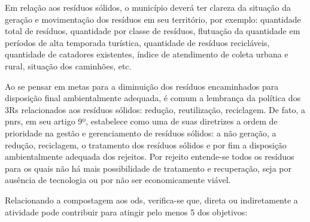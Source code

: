 Em relação aos resíduos sólidos, o município deverá ter clareza da situação da geração e movimentação dos resíduos em seu território, por exemplo: quantidade total de resíduos, quantidade por classe de resíduos, flutuação da quantidade em períodos de alta temporada turística, quantidade de resíduos recicláveis, quantidade de catadores existentes, índice de atendimento de coleta urbana e rural, situação dos caminhões, etc.

Ao se pensar em metas para a diminuição dos resíduos encaminhados para disposição final ambientalmente adequada, é comum a lembrança da política dos 3Rs relacionados aos resíduos sólidos: redução, reutilização, reciclagem. De fato, a \gls{pnrs}, em seu artigo 9º, estabelece como uma de suas diretrizes a ordem de prioridade na gestão e gerenciamento de resíduos sólidos: a não geração, a redução, reciclagem, o tratamento dos resíduos sólidos e por fim a disposição ambientalmente adequada dos rejeitos. \cite{brasil:12305} Por rejeito entende-se todos os resíduos para os quais não há mais possibilidade de tratamento e recuperação, seja por ausência de tecnologia ou por não ser economicamente viável.

Relacionando a compostagem aos \gls{ods}, verifica-se que, direta ou indiretamente a atividade pode contribuir para atingir pelo menos 5 dos objetivos:

